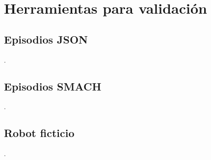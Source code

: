 \lstset{style=/Style/ROS/MSG}




\section{Herramientas para validación}

\subsection{Episodios JSON}
.

\subsection{Episodios SMACH}
.

\subsection{Robot ficticio}




.

